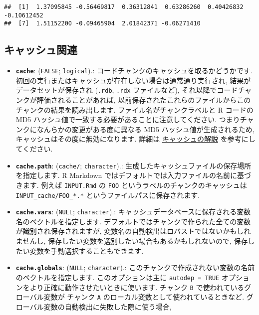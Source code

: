 \documentclass[
]{bxjsreport}
\providecommand{\tightlist}{%
  \setlength{\itemsep}{0pt}\setlength{\parskip}{0pt}}
\begin{document}
\begin{verbatim}
##  [1]  1.37095845 -0.56469817  0.36312841  0.63286260  0.40426832 -0.10612452
##  [7]  1.51152200 -0.09465904  2.01842371 -0.06271410
\end{verbatim}

\hypertarget{options-cache}{%
\subsection{キャッシュ関連}\label{options-cache}}

\begin{itemize}
\tightlist
\item
  \textbf{\texttt{cache}}: (\texttt{FALSE}; \texttt{logical}).:
  コードチャンクのキャッシュを取るかどうかです.
  初回の実行またはキャッシュが存在しない場合は通常通り実行され,
  結果がデータセットが保存され (\texttt{.rdb}, \texttt{.rdx}
  ファイルなど), それ以降でコードチャンクが評価されることがあれば,
  以前保存されたこれらのファイルからこのチャンクの結果を読み出します.
  ファイル名がチャンクラベルと R コードの MD5
  ハッシュ値で一致する必要があることに注意してください.
  つまりチャンクになんらかの変更がある度に異なる MD5
  ハッシュ値が生成されるため, キャッシュはその度に無効になります. 詳細は
  \protect\hyperlink{cache}{キャッシュの解説} を参考にしてください.
\item
  \textbf{\texttt{cache.path}}:
  (\texttt{\textquotesingle{}cache/\textquotesingle{}};
  \texttt{character}).:
  生成したキャッシュファイルの保存場所を指定します. R Markdown
  ではデフォルトでは入力ファイルの名前に基づきます. 例えば
  \texttt{INPUT.Rmd} の \texttt{FOO}
  というラベルのチャンクのキャッシュは \texttt{INPUT\_cache/FOO\_*.*}
  というファイルパスに保存されます.
\item
  \textbf{\texttt{cache.vars}}: (\texttt{NULL}; \texttt{character}).:
  キャッシュデータベースに保存される変数名のベクトルを指定します.
  デフォルトではチャンクで作られた全ての変数が識別され保存されますが,
  変数名の自動検出はロバストではないかもしれませんし,
  保存したい変数を選別したい場合もあるかもしれないので,
  保存したい変数を手動選択することもできます.
\item
  \textbf{\texttt{cache.globals}}: (\texttt{NULL}; \texttt{character}).:
  このチャンクで作成されない変数の名前のベクトルを指定します.
  このオプションは主に \texttt{autodep\ =\ TRUE}
  オプションをより正確に動作させたいときに使います. チャンク \texttt{B}
  で使われているグローバル変数が チャンク \texttt{A}
  のローカル変数として使われているときなど.
  グローバル変数の自動検出に失敗した際に使う場合,

\end{itemize}
\end{document}
